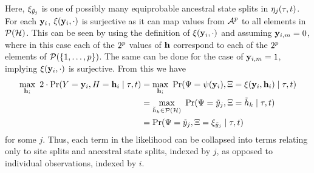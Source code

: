 Here, $\xi_{\tilde{y}_j}$ is one of possibly many equiprobable ancestral state splits in $\eta_j(\tau, t)$.
For each $\mathbf{y}_i$, $\xi(\mathbf{y}_i, \cdot)$ is surjective as it can map values from $\mathcal{A}^p$ to all elements in $\mathcal{P}(\mathcal{H})$.
This can be seen by using the definition of $\xi(\mathbf{y}_i, \cdot)$ and assuming $\mathbf{y}_{i,m}=0$, where in this case each of the $2^p$ values of $\mathbf{h}$ correspond to each of the $2^p$ elements of $\mathcal{P}(\{1,\ldots,p\})$.
The same can be done for the case of $\mathbf{y}_{i,m}=1$, implying $\xi(\mathbf{y}_i, \cdot)$ is surjective.
From this we have
\begin{align*}
    \max_{\ancestralStateColumn_i} \ 2\cdot\Pr(\alignmentColumnRV=\alignmentColumn_i, \ancestralStateColumnRV=\ancestralStateColumn_i \mid \tau, t) &= \max_{\ancestralStateColumn_i} \ \Pr(\siteSplitRV=\patternToSplit(\alignmentColumn_i), \ancestralSplitRV=\ancestralToSplit(\alignmentColumn_i, \ancestralStateColumn_i) \mid \tau, t)\\
    &= \max_{\ancestralSplit_k\in\mathcal{P}(\ancestralSplitSet)} \ \Pr(\siteSplitRV=\siteSplit_j, \ancestralSplitRV=\ancestralSplit_k \mid \tau, t)\\
    &= \Pr(\siteSplitRV=\siteSplit_j, \ancestralSplitRV = \xi_{\siteSplit_j} \mid \tau, t)
\end{align*}
for some $j$.
Thus, each term in the likelihood can be collapsed into terms relating only to site splits and ancestral state splits, indexed by $j$, as opposed to individual observations, indexed by $i$.

